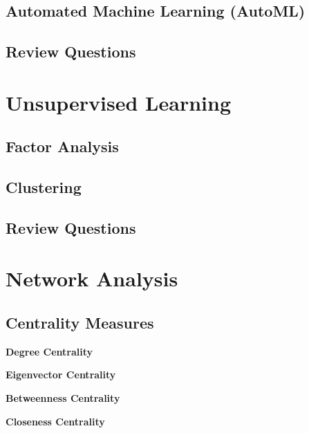 \documentclass[]{book}
\begin{document}
\hypertarget{automated-machine-learning-automl}{%
\section{Automated Machine Learning (AutoML)}\label{automated-machine-learning-automl}}

\hypertarget{review-questions-10}{%
\section{Review Questions}\label{review-questions-10}}

\hypertarget{unsup-lrn}{%
\chapter{Unsupervised Learning}\label{unsup-lrn}}

\hypertarget{factor-analysis}{%
\section{Factor Analysis}\label{factor-analysis}}

\hypertarget{clustering}{%
\section{Clustering}\label{clustering}}

\hypertarget{review-questions-11}{%
\section{Review Questions}\label{review-questions-11}}

\hypertarget{net-anal}{%
\chapter{Network Analysis}\label{net-anal}}

\hypertarget{centrality-measures}{%
\section{Centrality Measures}\label{centrality-measures}}

\textbf{Degree Centrality}

\textbf{Eigenvector Centrality}

\textbf{Betweenness Centrality}

\textbf{Closeness Centrality}
\end{document}
